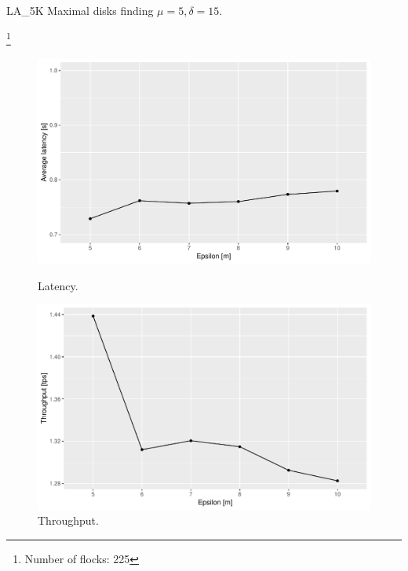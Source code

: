 \documentclass{beamer}
\newcommand\blfootnote[1]{%

  \begingroup

  \renewcommand\thefootnote{}\footnote{#1}%

  \addtocounter{footnote}{-1}%

  \endgroup

}
\begin{document}
\begin{frame}{LA\_5K Maximal disks finding}
    $\mu=5, \delta=15$.\\
    \blfootnote{Number of flocks: 225}
    \centering
    \begin{figure}
        \begin{minipage}[b]{0.48\textwidth}
            \includegraphics[width=\textwidth]{figures/LA_5K_MaximalsLatency}
            \caption{Latency.}
        \end{minipage}
        \hfill
        \begin{minipage}[b]{0.48\textwidth}
            \includegraphics[width=\textwidth]{figures/LA_5K_MaximalsThroughput}
            \caption{Throughput.}
        \end{minipage}
    \end{figure}    
\end{frame}
\end{document}
